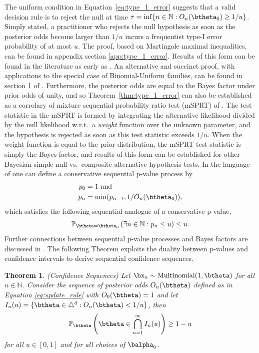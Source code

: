 \documentclass[11pt]{article}
\newtheorem{thm}{Theorem}[section]
\begin{document}
The uniform condition in Equation~\ref{eq:type_1_error} suggests that a valid decision rule is to reject the null at time $\tau = \inf \lbrace n \in \mathbb{N}: O_n(\btheta_0) \geq 1/u \rbrace$.
Simply stated, a practitioner who rejects the null hypothesis as soon as the posterior odds become larger than $1/u$ incurs a frequentist type-I error probability of at most $u$.
The proof, based on Martingale maximal inequalities, can be found in appendix section \ref{app:type_1_error}.
Results of this form can be found in the literature as early as \cite{ville}.
An alternative and succinct proof, with applications to the special case of Binomial-Uniform families, can be found in section 1 of \cite{robbins}.
Furthermore, the posterior odds are equal to the Bayes factor under prior odds of unity, and so Theorem~\ref{thm:type_1_error} can also be established as a corrolary of mixture sequential probability ratio test (mSPRT) of \cite{wald}.
The test statistic in the mSPRT is formed by integrating the alternative likelihood divided by the null likelihood w.r.t.\ a \textit{weight} function over the unknown parameter, and the hypothesis is rejected as soon as this test statistic exceeds $1/u$.
When the weight function is equal to the prior distribution, the mSPRT test statistic is simply the Bayes factor, and results of this form can be established for other Bayesian simple null vs.\ composite alternative hypothesis tests.
In the language of \cite{johari} one can define a conservative sequential p-value process by
\begin{align*}
  p_0 &=1 \text{ and}\\
  p_n &= \min(p_{n-1}, 1/O_n(\btheta_0)),
\end{align*}
which satisfies the following sequential analogue of a conservative p-value,
\begin{equation}
  \label{eq:conservative_p_value}
  \mathbb{P}_{\btheta = \btheta_0}\left( \exists n \in \mathbb{N}: p_n \leq u \right) \leq u.
\end{equation}
Further connections between sequential p-value processes and Bayes factors are discussed in \cite{shafer}.
The following Theorem exploits the duality between p-values and confidence intervals to derive sequential confidence sequences. 
\begin{thm}(Confidence Sequences)
  \label{thm:confidence_sequence}
  \noindent Let $\bx_n\sim \mathrm{Multinomial}(1,\btheta)$ for all $n \in \mathbb{N}$.
Consider the sequence of posterior odds $O_n(\btheta)$ defined as in Equation \eqref{eq:update_rule} with $O_0(\btheta)=1$ and
 let $I_n(u) = \lbrace \btheta \in \triangle^d : O_n(\btheta) < 1/u  \rbrace$, then
\begin{equation}
  \label{eq:confidence_sequence}
  \mathbb{P}_{\btheta}\left( \btheta \in \bigcap_{n=1}^{\infty} I_n(u) \right) \geq 1- u
\end{equation}
for all $u \in [0,1]$ and for all choices of $\balpha_0$.
\end{thm}
\end{document}
